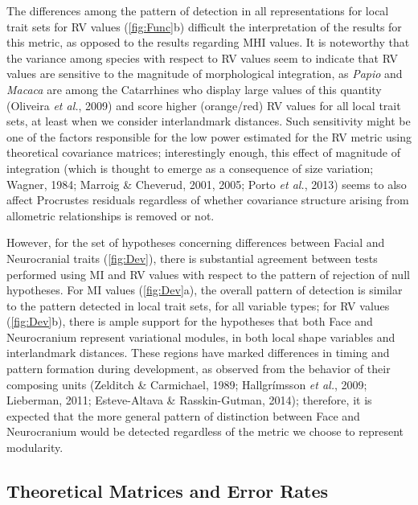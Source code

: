 \documentclass[12pt,twoside]{report}
\begin{document}
The differences among the pattern of detection in all representations
for local trait sets for RV values (\autoref{fig:Func}b) difficult the
interpretation of the results for this metric, as opposed to the results
regarding MHI values. It is noteworthy that the variance among species
with respect to RV values seem to indicate that RV values are sensitive
to the magnitude of morphological integration, as \emph{Papio} and
\emph{Macaca} are among the Catarrhines who display large values of this
quantity (Oliveira \emph{et al.}, 2009) and score higher (orange/red) RV
values for all local trait sets, at least when we consider interlandmark
distances. Such sensitivity might be one of the factors responsible for
the low power estimated for the RV metric using theoretical covariance
matrices; interestingly enough, this effect of magnitude of integration
(which is thought to emerge as a consequence of size variation; Wagner,
1984; Marroig \& Cheverud, 2001, 2005; Porto \emph{et al.}, 2013) seems
to also affect Procrustes residuals regardless of whether covariance
structure arising from allometric relationships is removed or not.

However, for the set of hypotheses concerning differences between Facial
and Neurocranial traits (\autoref{fig:Dev}), there is substantial
agreement between tests performed using MI and RV values with respect to
the pattern of rejection of null hypotheses. For MI values
(\autoref{fig:Dev}a), the overall pattern of detection is similar to the
pattern detected in local trait sets, for all variable types; for RV
values (\autoref{fig:Dev}b), there is ample support for the hypotheses
that both Face and Neurocranium represent variational modules, in both
local shape variables and interlandmark distances. These regions have
marked differences in timing and pattern formation during development,
as observed from the behavior of their composing units (Zelditch \&
Carmichael, 1989; Hallgrímsson \emph{et al.}, 2009; Lieberman, 2011;
Esteve-Altava \& Rasskin-Gutman, 2014); therefore, it is expected that
the more general pattern of distinction between Face and Neurocranium
would be detected regardless of the metric we choose to represent
modularity.

\subsection{Theoretical Matrices and Error
Rates}\label{theoretical-matrices-and-error-rates}
\end{document}
